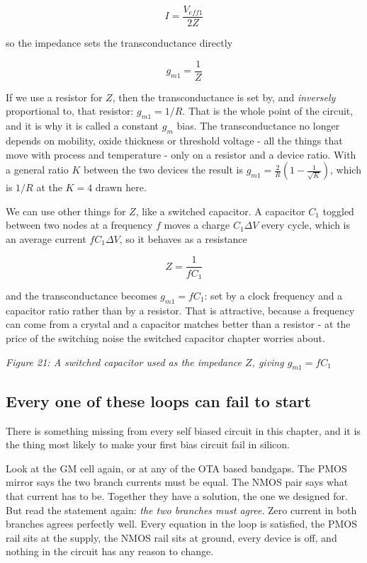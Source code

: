 \[ I = \frac{ V_{eff1}}{2Z} \]

so the impedance sets the transconductance directly

\[ g_{m1} = \frac{1}{Z} \]

If we use a resistor for \(Z\), then the transconductance is set by, and
\emph{inversely} proportional to, that resistor: \(g_{m1} = 1/R\). That
is the whole point of the circuit, and it is why it is called a constant
\(g_m\) bias. The transconductance no longer depends on mobility, oxide
thickness or threshold voltage - all the things that move with process
and temperature - only on a resistor and a device ratio. With a general
ratio \(K\) between the two devices the result is
\(g_{m1} = \frac{2}{R}\left(1 - \frac{1}{\sqrt{K}}\right)\), which is
\(1/R\) at the \(K = 4\) drawn here.

We can use other things for \(Z\), like a switched capacitor. A
capacitor \(C_1\) toggled between two nodes at a frequency \(f\) moves a
charge \(C_1 \Delta V\) every cycle, which is an average current
\(f C_1 \Delta V\), so it behaves as a resistance

\[ Z = \frac{1}{f C_1} \]

and the transconductance becomes \(g_{m1} = f C_1\): set by a clock
frequency and a capacitor ratio rather than by a resistor. That is
attractive, because a frequency can come from a crystal and a capacitor
matches better than a resistor - at the price of the switching noise the
switched capacitor chapter worries about.


{
\centering
{}
}

\emph{Figure 21: A switched capacitor used as the impedance \(Z\),
giving \(g_{m1} = f C_1\)}

\subsection{Every one of these loops can fail to
start}\label{every-one-of-these-loops-can-fail-to-start}

There is something missing from every self biased circuit in this
chapter, and it is the thing most likely to make your first bias circuit
fail in silicon.

Look at the GM cell again, or at any of the OTA based bandgaps. The PMOS
mirror says the two branch currents must be equal. The NMOS pair says
what that current has to be. Together they have a solution, the one we
designed for. But read the statement again: \emph{the two branches must
agree}. Zero current in both branches agrees perfectly well. Every
equation in the loop is satisfied, the PMOS rail sits at the supply, the
NMOS rail sits at ground, every device is off, and nothing in the
circuit has any reason to change.

